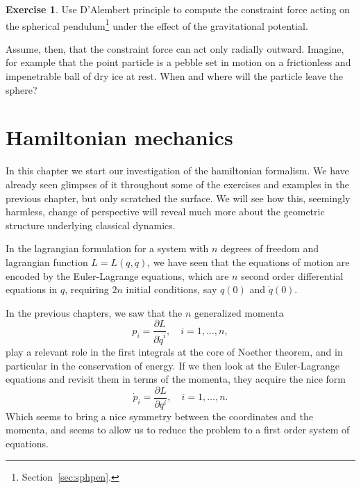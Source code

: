 \documentclass[english,fontsize=11pt,paper=b5]{scrbook}
\theoremstyle{definition}
\newtheorem{exercise}{Exercise}[chapter]
\begin{document}
    \begin{exercise}
      Use D'Alembert principle to compute the constraint force acting on the spherical pendulum\footnote{Section~\ref{sec:sphpen}.} under the effect of the gravitational potential.

      Assume, then, that the constraint force can act only radially outward. Imagine, for example that the point particle is a pebble set in motion on a frictionless and impenetrable ball of dry ice at rest.
      When and where will the particle leave the sphere?
    \end{exercise}


    \chapter{Hamiltonian mechanics}

    In this chapter we start our investigation of the hamiltonian formalism.
    We have already seen glimpses of it throughout some of the exercises and examples in the previous chapter, but only scratched the surface.
    We will see how this, seemingly harmless, change of perspective will reveal much more about the geometric structure underlying classical dynamics.

    In the lagrangian formulation for a system with $n$ degrees of freedom and lagrangian function $L=L(q, \dot q)$, we have seen that the equations of motion are encoded by the Euler-Lagrange equations, which are $n$ second order differential equations in $q$, requiring $2n$ initial conditions, say $q(0)$ and $\dot q(0)$.

    In the previous chapters, we saw that the $n$ generalized momenta
    \begin{equation}
      p_i = \frac{\partial L}{\partial \dot q^i}, \quad i=1,\ldots,n,
    \end{equation}
    play a relevant role in the first integrals at the core of Noether theorem, and in particular in the conservation of energy.
    If we then look at the Euler-Lagrange equations and revisit them in terms of the momenta, they acquire the nice form
    \begin{equation}
      \dot p_i = \frac{\partial L}{\partial q^i}, \quad i=1,\ldots,n.
    \end{equation}
    Which seems to bring a nice symmetry between the coordinates and the momenta, and seems to allow us to reduce the problem to a first order system of equations.
\end{document}

